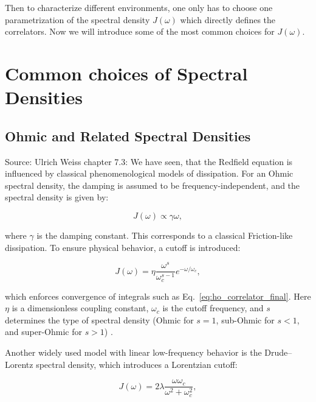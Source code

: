 \noindent
Then to characterize different environments, one only has to choose one parametrization of the spectral density $J(\omega)$ which directly defines the correlators. Now we will introduce some of the most common choices for $J(\omega)$.

\section{Common choices of Spectral Densities}
\label{sec:common_choices_spectral_densities}

\subsection{Ohmic and Related Spectral Densities}
\label{subsec:ohmic_spectral_density}

\noindent
Source: Ulrich Weiss chapter 7.3:
We have seen, that the Redfield equation is influenced by classical phenomenological models of dissipation. For an Ohmic spectral density, the damping is assumed to be frequency-independent, and the spectral density is given by:

\begin{equation} \label{eq:ohmic_spectral_density}
        J(\omega) \propto \gamma \omega,
\end{equation}

\noindent
where \( \gamma \) is the damping constant. This corresponds to a classical Friction-like dissipation. To ensure physical behavior, a cutoff is introduced:

\begin{equation} \label{eq:cutoff_spectral_density}
        J(\omega) = \eta \frac{\omega^s}{\omega_c^{s-1}} e^{-\omega / \omega_c},
\end{equation}

\noindent
which enforces convergence of integrals such as Eq.~\eqref{eq:ho_correlator_final}. Here \( \eta \) is a dimensionless coupling constant, \( \omega_c \) is the cutoff frequency, and \( s \) determines the type of spectral density (Ohmic for \( s = 1 \), sub-Ohmic for \( s < 1 \), and super-Ohmic for \( s > 1 \)) \cite{weiss2012quantumdissipativesystems, lambertetal2024qutip5quantum}.

\noindent
Another widely used model with linear low-frequency behavior is the Drude--Lorentz spectral density, which introduces a Lorentzian cutoff:

\begin{equation}
	\label{eq:dl_spectral_density}
	J(\omega) = 2 \lambda \frac{\omega \omega_c}{\omega^2 + \omega_c^2},
\end{equation}

